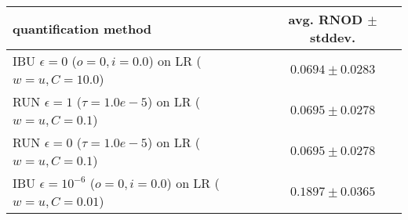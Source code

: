 \begin{tabular}{lc}
  \toprule
  quantification method & avg. RNOD $\pm$ stddev. \\
  \midrule
  IBU $\epsilon=0$ ($o=0, i=0.0$) on LR ($w=u, C=10.0$) & $\mathbf{0.0694 \pm 0.0283}$ \\
  RUN $\epsilon=1$ ($\tau=1.0e-5$) on LR ($w=u, C=0.1$) & $\mathbf{0.0695 \pm 0.0278}$ \\
  RUN $\epsilon=0$ ($\tau=1.0e-5$) on LR ($w=u, C=0.1$) & $\mathbf{0.0695 \pm 0.0278}$ \\
  IBU $\epsilon=10^{-6}$ ($o=0, i=0.0$) on LR ($w=u, C=0.01$) & $0.1897 \pm 0.0365$ \\
  \bottomrule
\end{tabular}
